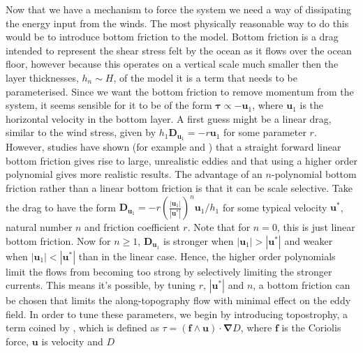 \documentclass[10pt,a4paper]{report}
\begin{document}
  Now that we have a mechanism to force the system we need a way of dissipating the 
  energy input from the winds. The most physically reasonable way to do this would be to
   introduce bottom friction to the model. Bottom friction is a drag intended to represent 
  the shear stress felt by the ocean as it flows over the ocean floor, however
  because this operates on a vertical scale much smaller then the layer thicknesses, $h_{n} \sim H$, of  the model it is a term that needs to be 
  parameterised. Since we want the bottom friction to remove momentum
  from the system, it seems sensible for it to be of the form $\boldsymbol{\tau} \propto
  - \boldsymbol{u}_{1}$, where $\boldsymbol{u}_{1}$ is the horizontal velocity
  in the bottom layer. A first guess might be a linear drag, similar to the wind stress,
  given by  $h_{1}\boldsymbol{D}_{\boldsymbol{u}_{1}} = - r \boldsymbol{u}_{1}$ for
  some parameter $r$. However, studies have shown (for example \cite{grianik2004effects} and
  \cite{arbic2008quadratic})
  that a straight forward linear
  bottom friction gives rise to large, unrealistic eddies and that using a higher order
  polynomial gives more realistic results.
  The advantage of an $n$-polynomial bottom  friction rather than 
  a linear bottom friction is that it can be scale selective. Take the 
  drag to have the form $\boldsymbol{D}_{\boldsymbol{u}_{1}} = 
  - r \left( \frac{ \left|\boldsymbol{u}_{1}\right| }
  {\left|\boldsymbol{u}^{\ast}\right|}\right)^{n}
  \boldsymbol{u}_{1}/h_{1}$ for some typical velocity $\boldsymbol{u}^{\ast}$, 
  natural number $n$ and friction coefficient $r$. Note that for $n=0$, this is 
  just linear bottom friction. Now for $n \geq 1$, $\boldsymbol{D}_{\boldsymbol{u}_{1}}$
  is stronger when $\left|\boldsymbol{u}_{1}\right| > \left|\boldsymbol{u}^{\ast}\right|$
  and weaker when $\left|\boldsymbol{u}_{1}\right| < \left|\boldsymbol{u}^{\ast}\right|$
  than in the linear case. Hence, the higher order polynomials limit the flows from 
  becoming too strong by selectively limiting the stronger currents.
  This means it's possible, by tuning $r$, $\left|\boldsymbol{u}^{\ast}\right|$ and 
  $n$, a bottom friction can be chosen that limits the along-topography flow with
  minimal effect on the eddy field. In order to tune these parameters, we begin by 
  introducing topostrophy, a term coined by \cite{holloway2007water}, which is defined as
  $\tau = \left(\boldsymbol{ f } \wedge
  \boldsymbol{ u } \right) \cdot \boldsymbol{\nabla} D $,
  where $\boldsymbol{f}$ is the Coriolis force, $\boldsymbol{u}$ is velocity and $D$
\end{document}

